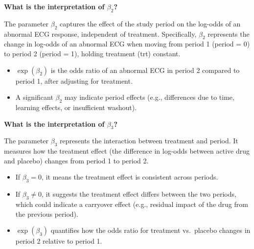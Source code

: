 \documentclass[
  letterpaper,
  DIV=11,
  numbers=noendperiod]{scrreprt}
\providecommand{\tightlist}{%
  \setlength{\itemsep}{0pt}\setlength{\parskip}{0pt}}\usepackage{longtable,booktabs,array}
\begin{document}
\begin{tcolorbox}[enhanced jigsaw, rightrule=.15mm, breakable, left=2mm, colframe=quarto-callout-tip-color-frame, opacityback=0, leftrule=.75mm, toprule=.15mm, colback=white, arc=.35mm, bottomrule=.15mm]

\textbf{What is the interpretation of \(\beta_2\)?}\vspace{2mm}

The parameter \(\beta_2\) captures the effect of the study period on the
log-odds of an abnormal ECG response, independent of treatment.
Specifically, \(\beta_2\) represents the change in log-odds of an
abnormal ECG when moving from period 1 (period = 0) to period 2 (period
= 1), holding treatment (trt) constant.

\begin{itemize}
\tightlist
\item
  \(\exp(\beta_2)\) is the odds ratio of an abnormal ECG in period 2
  compared to period 1, after adjusting for treatment.
\item
  A significant \(\beta_2\) may indicate period effects (e.g.,
  differences due to time, learning effects, or insufficient washout).
\end{itemize}

\end{tcolorbox}

\begin{tcolorbox}[enhanced jigsaw, rightrule=.15mm, breakable, left=2mm, colframe=quarto-callout-tip-color-frame, opacityback=0, leftrule=.75mm, toprule=.15mm, colback=white, arc=.35mm, bottomrule=.15mm]

\textbf{What is the interpretation of \(\beta_3\)?}\vspace{2mm}

The parameter \(\beta_3\) represents the interaction between treatment
and period. It measures how the treatment effect (the difference in
log-odds between active drug and placebo) changes from period 1 to
period 2.

\begin{itemize}
\tightlist
\item
  If \(\beta_3 = 0\), it means the treatment effect is consistent across
  periods.
\item
  If \(\beta_3 \neq 0\), it suggests the treatment effect differs
  between the two periods, which could indicate a carryover effect
  (e.g., residual impact of the drug from the previous period).
\item
  \(\exp(\beta_3)\) quantifies how the odds ratio for treatment
  vs.~placebo changes in period 2 relative to period 1.
\end{itemize}

\end{tcolorbox}
\end{document}
